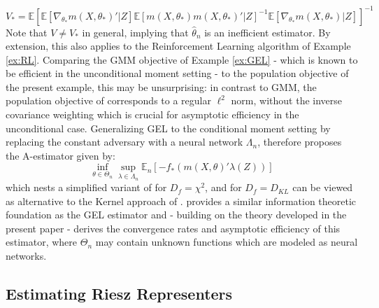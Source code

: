 \documentclass[12pt]{article}
\theoremstyle{myplain}
\theoremstyle{definition}
\theoremstyle{definition}
\theoremstyle{remark}
\numberwithin{equation}{section}
\begin{document}
$$V_*=\mathbb{E}\left[\mathbb{E}\left[\nabla_{\theta_*}m(X,\theta_*)'|Z\right]\mathbb{E}\left[m(X,\theta_*)m(X,\theta_*)'|Z\right]^{-1}\mathbb{E}\left[\nabla_{\theta_*}m(X,\theta_*)|Z\right]\right]^{-1}$$
Note that $V\neq V_*$ in general, implying that $\widehat{\theta}_n$ is an inefficient estimator. By extension, this also applies to the Reinforcement Learning algorithm of Example \ref{ex:RL}. Comparing the GMM objective of Example \ref{ex:GEL} - which is known to be efficient in the unconditional moment setting - to the population objective of the present example, this may be unsurprising: in contrast to GMM, the population objective of \cite{dikkala2020minimax} corresponds to a regular $\ell^2$ norm, without the inverse covariance weighting which is crucial for asymptotic efficiency in the unconditional case. Generalizing GEL to the conditional moment setting by replacing the constant adversary with a neural network $\Lambda_n$, \cite{metzger2021} therefore proposes the A-estimator given by:
$$\inf_{\theta\in\Theta_n}\sup_{\lambda\in\Lambda_n}\mathbb{E}_n\left[-f_*\left(m(X,\theta)'\lambda(Z)\right)\right]$$
which nests a simplified variant of \cite{variationalMM2020} for $D_f=\chi^2$, and for $D_f=D_{KL}$ can be viewed as alternative to the Kernel approach of \cite{kitamura2004empirical}. \cite{metzger2021} provides a similar information theoretic foundation as the GEL estimator and - building on the theory developed in the present paper - derives the convergence rates and asymptotic efficiency of this estimator, where $\Theta_n$ may contain unknown functions which are modeled as neural networks.

\subsection{Estimating Riesz Representers}
\label{app:riesz}
\end{document}
